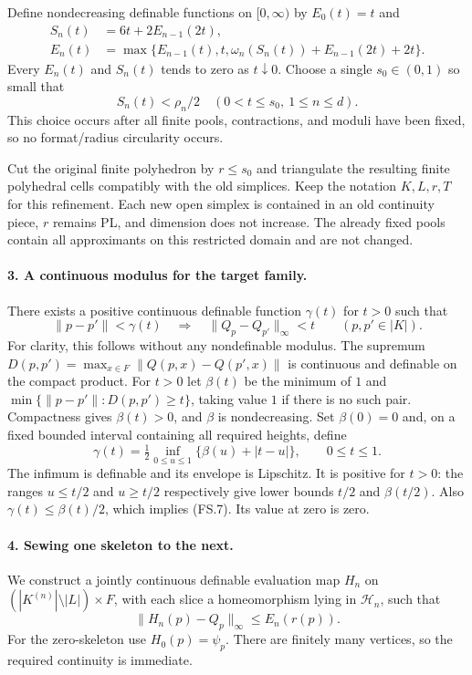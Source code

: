 Define nondecreasing definable functions on $[0,\infty)$ by $E_0(t)=t$ and
\[
\begin{split}
 S_n(t)&=6t+2E_{n-1}(2t),\\
 E_n(t)&=\max\{E_{n-1}(t),t,
       \omega_n(S_n(t))+E_{n-1}(2t)+2t\}.
\end{split}
\tag{FS.5}
\]
Every $E_n(t)$ and $S_n(t)$ tends to zero as $t\downarrow0$. Choose a single
$s_0\in(0,1)$ so small that
\[
 S_n(t)<\rho_n/2\quad(0<t\le s_0,\ 1\le n\le d).
 \tag{FS.6}
\]
This choice occurs after all finite pools, contractions, and moduli have
been fixed, so no format/radius circularity occurs.

Cut the original finite polyhedron by $r\le s_0$ and triangulate the
resulting finite polyhedral cells compatibly with the old simplices. Keep
the notation $K,L,r,T$ for this refinement. Each new open simplex is
contained in an old continuity piece, $r$ remains PL, and dimension does
not increase. The already fixed pools contain all approximants on this
restricted domain and are not changed.

\paragraph{3. A continuous modulus for the target family.}
There exists a positive continuous definable function $\gamma(t)$ for
$t>0$ such that
\[
 \|p-p'\|<\gamma(t)\quad\Longrightarrow\quad
 \|Q_p-Q_{p'}\|_\infty<t
 \qquad(p,p'\in|K|).
 \tag{FS.7}
\]
For clarity, this follows without any nondefinable modulus. The supremum
$D(p,p')=\max_{x\in F}\|Q(p,x)-Q(p',x)\|$ is continuous and definable
on the compact product. For $t>0$ let $\beta(t)$ be the minimum of $1$
and $\min\{\|p-p'\|:D(p,p')\ge t\}$, taking value $1$ if
there is no such pair. Compactness gives $\beta(t)>0$, and $\beta$ is
nondecreasing. Set $\beta(0)=0$ and, on a fixed bounded interval containing
all required heights, define
\[
 \gamma(t)=\tfrac12\inf_{0\le u\le1}\{\beta(u)+|t-u|\},
 \qquad 0\le t\le1.
\]
The infimum is definable and its envelope is Lipschitz. It is positive
for $t>0$: the ranges $u\le t/2$ and $u\ge t/2$ respectively give lower
bounds $t/2$ and $\beta(t/2)$. Also $\gamma(t)\le\beta(t)/2$, which implies
(FS.7). Its value at zero is zero.

\paragraph{4. Sewing one skeleton to the next.}
We construct a jointly continuous definable evaluation map $H_n$ on
$(|K^{(n)}|\setminus|L|)\times F$, with each slice a homeomorphism lying
in $\mathcal H_n$, such that
\[
 \|H_n(p)-Q_p\|_\infty\le E_n(r(p)).
 \tag{FS.8}
\]
For the zero-skeleton use $H_0(p)=\psi_p$. There are finitely many vertices,
so the required continuity is immediate.

